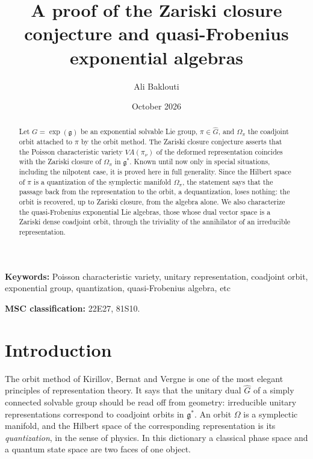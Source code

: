 \documentclass[11pt]{amsart}
\theoremstyle{plain}
\theoremstyle{definition}
\theoremstyle{remark}
\newcommand{\g}{\mathfrak g}
\newcommand{\VA}{V\!A}
\begin{document}
	
	\title[The Zariski closure conjecture]{A proof of the Zariski closure conjecture and quasi-Frobenius  exponential algebras}
	
	
	\author{Ali Baklouti}
	\address{Facult\'e des Sciences de Sfax}
	
	\date{October 2026}
	
	\begin{abstract}
		Let $G=\exp(\g)$ be an exponential solvable Lie group, $\pi\in\widehat G$, and $\Omega_\pi$ the coadjoint orbit attached to $\pi$ by the orbit method. The Zariski closure conjecture asserts that the Poisson characteristic variety $\VA(\pi_\nu)$ of the deformed representation coincides with the Zariski closure of $\Omega_\pi$ in $\g^*$. Known until now only in special situations, including the nilpotent case, it is proved here in full generality. Since the Hilbert space of $\pi$ is a quantization of the symplectic manifold $\Omega_\pi$, the statement says that the passage back from the representation to the orbit, a dequantization, loses nothing: the orbit is recovered, up to Zariski closure, from the algebra alone. We also characterize the quasi-Frobenius exponential Lie algebras, those whose dual vector space is a Zariski dense coadjoint orbit, through the triviality of the annihilator of an irreducible representation.
	\end{abstract}
	
	\maketitle
	
	\noindent\textbf{Keywords:} Poisson characteristic variety, unitary representation, coadjoint orbit, exponential group, quantization, quasi-Frobenius algebra, etc
	
	\noindent\textbf{MSC classification:} 22E27, 81S10.
	
	\section{Introduction}\label{sect:intro}
	
	
	
	The {orbit method} of Kirillov, Bernat and Vergne is one of the most elegant principles of representation theory. It says that the unitary dual $\widehat G$ of a simply connected solvable group should be read off from geometry: irreducible unitary representations correspond to coadjoint orbits in $\g^*$. An orbit $\Omega$ is a symplectic manifold, and the Hilbert space of the corresponding representation is its \emph{quantization}, in the sense of physics. In this dictionary a classical phase space and a quantum state space are two faces of one object.
	
\end{document}
